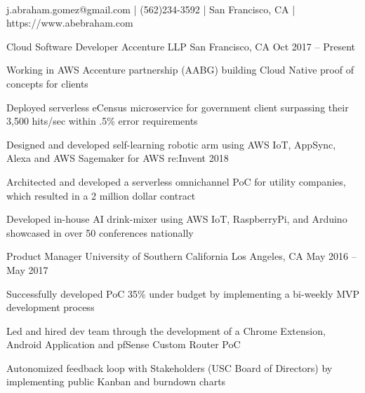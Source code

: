 \documentclass[]{awesome-cv}
\begin{document}
    
\begin{center}
	  \\
	\vspace{2mm}
	{j.abraham.gomez@gmail.com} | {(562)234-3592} | {San Francisco, CA} | {https://www.abebraham.com}
\end{center}

\begin{cventries}
	\cventry
	{Cloud Software Developer}
	{Accenture LLP}
	{San Francisco, CA}
	{Oct 2017 – Present}
	{\begin{cvitems}
		\item {Working in AWS Accenture partnership (AABG) building Cloud Native proof of concepts for clients}
		\item {Deployed serverless eCensus microservice for government client surpassing their 3,500 hits/sec within .5\% error requirements}
		\item{Designed and developed self-learning robotic arm using AWS IoT, AppSync, Alexa and AWS Sagemaker for AWS re:Invent 2018}
		\item {Architected and developed a serverless omnichannel PoC for utility companies, which resulted in a 2 million dollar contract}
		\item {Developed in-house AI drink-mixer using AWS IoT, RaspberryPi, and Arduino showcased in over 50 conferences nationally}
		\end{cvitems}}
	\cventry
	{Product Manager}
	{University of Southern California}
	{Los Angeles, CA}
	{May 2016 – May 2017}
	{\begin{cvitems}
		\item {Successfully developed PoC 35\% under budget by implementing a bi-weekly MVP development process}
		\item {Led and hired dev team through the development of a Chrome Extension, Android Application and pfSense Custom Router PoC}
		\item {Autonomized feedback loop with Stakeholders (USC Board of Directors) by implementing public Kanban and burndown charts}
		\end{cvitems}}
\end{cventries}
\vspace{-5mm}
\end{document}
